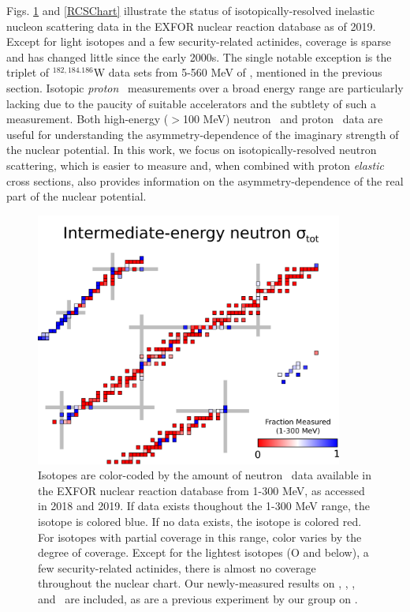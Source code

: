 Figs. \ref{TCSChart} and \ref{RCSChart} illustrate the status of isotopically-resolved inelastic
nucleon scattering data in the EXFOR nuclear reaction database as of 2019.
Except for light isotopes and a few security-related actinides, coverage is
sparse and has changed little since the early 2000s. The single notable
exception is the triplet of $^{182,184.186}$W data sets from 5-560 MeV of \cite{Dietrich2003}, 
mentioned in the previous section. Isotopic \textit{proton} \rxn\ measurements over
a broad energy range are particularly lacking due to the paucity of suitable
accelerators and the subtlety of such a measurement. 
Both high-energy ($>$100 MeV) neutron \tot\ and proton \rxn\ data are useful for
understanding the asymmetry-dependence of the imaginary strength of the nuclear potential.
In this work, we focus on isotopically-resolved neutron scattering, which
is easier to measure and, when combined with proton \textit{elastic} cross sections,
also provides information on the asymmetry-dependence of the real part of the nuclear potential.

\begin{figure}
    \centering
    \includegraphics[width=0.9\textwidth]{figures/TCSChart.png}
    \caption[Landscape of existing neutron \tot\ data in 2019]
    {Isotopes are color-coded by the amount of neutron \tot\ data available in the EXFOR nuclear
        reaction database from 1-300 MeV, as accessed in 2018 and 2019. If data exists thoughout the
        1-300 MeV range, the isotope
        is colored blue. If no data exists, the isotope is colored red. For
        isotopes with partial coverage in this range, color varies by the degree
        of coverage. Except for the lightest
        isotopes (O and below), a few security-related actinides, there is almost no coverage
        throughout the nuclear chart. Our newly-measured results on \oSixEight, \niEightFour,
        \rhThree, and \snTwelveFour\ are included, as are a previous experiment
        by our group on \caAughtEight \cite{Shane2010}.
    }
    \label{TCSChart}
\end{figure}

